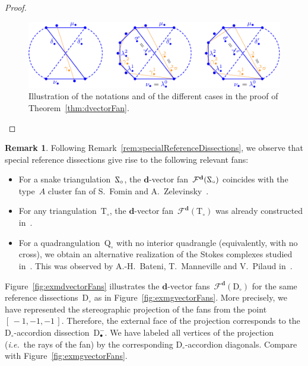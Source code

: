 \documentclass{amsart}
\theoremstyle{definition}
\newtheorem{remark}[theorem]{Remark}
\renewcommand{\b}[1]{\mathbf{#1}} %
\newcommand{\fref}[1]{Figure~\ref{#1}} %
\newcommand{\ie}{\textit{i.e.}~} %
\newcommand{\triangulation}{\mathrm{T}} %
\newcommand{\quadrangulation}{\mathrm{Q}} %
\newcommand{\dissection}{\mathrm{D}} %
\newcommand{\snake}{\reflectbox{$\mathrm{Z}$}} %
\newcommand{\dvectorFan}{\mathcal{F}^\mathbf{d}} %
\newcommand{\mi}{-} %
\begin{document}
\begin{proof}
%
\begin{figure}
	\capstart
	\centerline{\includegraphics[scale=1]{proofdvectorFan}}
	\caption{Illustration of the notations and of the different cases in the proof of Theorem~\ref{thm:dvectorFan}.}
	\label{fig:proofdvectorFan}
\end{figure}
\end{proof}

\begin{remark}
Following Remark~\ref{rem:specialReferenceDissections}, we observe that special reference dissections give rise to the following relevant fans:
\begin{itemize}
\item For a snake triangulation~$\snake_\circ$, the $\b{d}$-vector fan~$\dvectorFan(\snake_\circ)$ coincides with the type~$A$ cluster fan of S.~Fomin and A.~Zelevinsky~\cite{FominZelevinsky-ClusterAlgebrasII}.
\item For any triangulation~$\triangulation_\circ$, the $\b{d}$-vector fan~$\dvectorFan(\triangulation_\circ)$ was already constructed in~\cite{CeballosSantosZiegler}.
\item For a quadrangulation~$\quadrangulation_\circ$ with no interior quadrangle (equivalently, with no cross), we obtain an alternative realization of the Stokes complexes studied in~\cite{Baryshnikov, Chapoton-quadrangulations}. This was observed by A.-H.~Bateni, T.~Manneville and V.~Pilaud in~\cite{BateniMannevillePilaud}.
\end{itemize}
\fref{fig:exmdvectorFans} illustrates the $\b{d}$-vector fans~$\dvectorFan(\dissection_\circ)$ for the same reference dissections~$\dissection_\circ$ as in \fref{fig:exmgvectorFans}. More precisely, we have represented the stereographic projection of the fans from the point~$[\, -1, -1, -1 \,]$. Therefore, the external face of the projection corresponds to the $\dissection_\circ$-accordion dissection~$\dissection_\bullet^\mi$. We have labeled all vertices of the projection (\ie the rays of the fan) by the corresponding $\dissection_\circ$-accordion diagonals. Compare with \fref{fig:exmgvectorFans}.


\end{remark}
\end{document}

